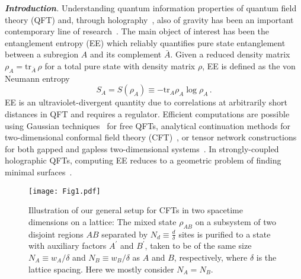 \documentclass[prl,a4paper,notitlepage,twocolumn,superscriptaddress,longbibliography,reprint]{revtex4-2}
\newcommand{\mysection}[1]{{\vspace{10 pt}\noindent \emph{{\textbf{#1}}.}}}
\begin{document}
\mysection{Introduction} Understanding quantum information properties of quantum field theory (QFT) and, through holography~\cite{Maldacena:1997re,Gubser:1998bc,Witten:1998qj}, also of gravity has been an important contemporary line of research~\cite{Casini:2009sr,Harlow:2014yka,Rangamani:2016dms,Susskind:2018pmk,Headrick:2019eth}. The main object of interest has been the entanglement entropy (EE) which reliably quantifies pure state entanglement between a subregion $A$ and its complement $\bar{A}$.
Given a reduced density matrix $\rho_{A} = \mathrm{tr}_{\bar{A}}\, \rho$ for a total pure state with density matrix $\rho$, EE is defined as the von Neumann entropy
\begin{equation}\label{eq:VNEntropy}
S_A=S(\rho_A) \equiv -\mathrm{tr}_{A} \rho_{A} \log{\rho_{A}}\,.
\end{equation}
EE is an ultraviolet-divergent quantity due to correlations at arbitrarily short distances in QFT and requires a regulator.
Efficient computations are possible using Gaussian techniques~\cite{sorkin1983entropy,peschel2003calculation,Weedbrook2012,Bianchi:2015fra,Hackl:2020ken} for free QFTs, analytical continuation methods for two-dimensional conformal field theory (CFT)~\cite{Holzhey:1994we,Calabrese:2004eu,Calabrese:2009qy,Calabrese:2009ez,Cardy:2013nua,Ugajin:2016opf}, or tensor network constructions for both gapped and gapless two-dimensional systems~\cite{Hastings:2007iok,Vidal:2008zz}. 
In strongly-coupled holographic QFTs, computing EE reduces to a geometric problem of finding minimal surfaces~\cite{Ryu:2006bv,Hubeny:2007xt,Lewkowycz:2013nqa,Dong:2016hjy}.

\begin{figure}
    \centering
    \texttt{[image: Fig1.pdf]}
    \caption{Illustration of our general setup for CFTs in two spacetime dimensions on a lattice: The mixed state $\rho_{AB}$ on a subsystem of two disjoint regions $A B$ separated by $N_{d} \equiv \frac{d}{\delta}$ sites is purified to a state with auxiliary factors $A^\prime$ and $B^\prime$, taken to be of the same size $N_{A} \equiv w_A/\delta$ and $N_{B} \equiv w_B/\delta$ as $A$ and $B$, respectively, where $\delta$ is the lattice spacing. Here we mostly consider $N_A=N_B$.
    }
    \label{fig:eop_def}
\end{figure}
\end{document}
